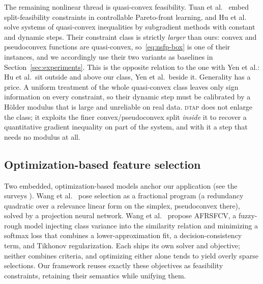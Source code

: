 \documentclass[]{interact}
\theoremstyle{plain}
\theoremstyle{definition}
\theoremstyle{remark}
\newcommand{\dtap}{\textsc{dtap}}
\begin{document}
The remaining nonlinear thread is quasi-convex feasibility. Tuan et al.~\citep{tuan2024} embed
split-feasibility constraints in controllable Pareto-front learning, and Hu et
al.~\citep{hu2022quasi} solve systems of quasi-convex inequalities by subgradient methods with
constant and dynamic steps. Their constraint class is strictly \emph{larger} than ours: convex and
pseudoconvex functions are quasi-convex, so~\eqref{eq:nsfp-box} is one of their instances, and we
accordingly use their two variants as baselines in Section~\ref{sec:experiments}. This is the
opposite relation to the one with Yen et al.: Hu et al.\ sit outside and above our class, Yen et
al.\ beside it. Generality has a price. A uniform treatment of the whole quasi-convex class leaves
only sign information on every constraint, so their dynamic step must be calibrated by a H\"older
modulus that is large and unreliable on real data. \dtap{} does not enlarge the class; it exploits
the finer convex/pseudoconvex split \emph{inside} it to recover a quantitative gradient inequality
on part of the system, and with it a step that needs no modulus at all.


\subsection{Optimization-based feature selection}\label{ssec:rel-fs}
Two embedded, optimization-based models anchor our application (see the surveys
\citep{guyon2003,theng2024fs,liu2026rfs}). Wang et al.~\citep{wang2021fractional} pose selection
as a fractional program (a redundancy quadratic over a relevance linear form on the simplex,
pseudoconvex there), solved by a projection neural network. Wang et al.~\citep{wang2026afrsfcv}
propose AFRSFCV, a fuzzy-rough model injecting class variance into the similarity relation and
minimizing a softmax loss that combines a lower-approximation fit, a decision-consistency term,
and Tikhonov regularization. Each ships its own solver and objective; neither combines criteria,
and optimizing either alone tends to yield overly sparse selections. Our framework reuses exactly these objectives as
feasibility constraints, retaining their semantics while unifying them.
\end{document}
